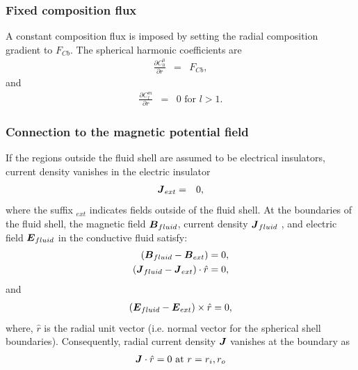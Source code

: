 \subsubsection{Fixed composition flux}
A constant composition flux is imposed by setting the radial composition gradient to $F_{Cb}$. The spherical harmonic coefficients are
%
\begin{eqnarray}
\frac{\partial C_{0}^{0}}{\partial r} & = &  F_{Cb},
\nonumber
\end{eqnarray}
%
and 
%
\begin{eqnarray}
\frac{\partial C_{l}^{m}}{\partial r} & = & 0 \mbox{ for } l > 1.
\nonumber
\end{eqnarray}
%
\subsubsection{Connection to the magnetic potential field}
If the regions outside the fluid shell are assumed to be electrical insulators, current density vanishes in the electric insulator
\begin{eqnarray}
\mbox{\boldmath$J$}_{ext} &= & 0,
\nonumber
\end{eqnarray}
%
where the suffix ${}_{ext}$ indicates fields outside of the fluid shell. At the boundaries of the fluid shell, the magnetic field $\mbox{\boldmath$B$}_{fluid}$, current density $\mbox{\boldmath$J$}_{fluid}$ , and electric field $\mbox{\boldmath$E$}_{fluid}$ in the conductive fluid satisfy:
\begin{eqnarray}
\left (\mbox{\boldmath$B$}_{fluid} - \mbox{\boldmath$B$}_{ext} \right)  = 0,
\nonumber \\
\left (\mbox{\boldmath$J$}_{fluid} - \mbox{\boldmath$J$}_{ext} \right)  \cdot \hat{r}   = 0,
\nonumber
\end{eqnarray}
and 
\begin{eqnarray}
\left (\mbox{\boldmath$E$}_{fluid} - \mbox{\boldmath$E$}_{ext} \right) \times \hat{r}  = 0,
\nonumber
\end{eqnarray}
%
where, $\hat{r}$ is the radial unit vector (i.e. normal vector for the spherical shell boundaries). 
Consequently, radial current density $\mbox{\boldmath$J$} $ vanishes at the boundary as
\begin{eqnarray}
\mbox{\boldmath$J$} \cdot \hat{r}  = 0
 \mbox{ at } r = r_{i}, r_{o}
\nonumber
\end{eqnarray}
%


